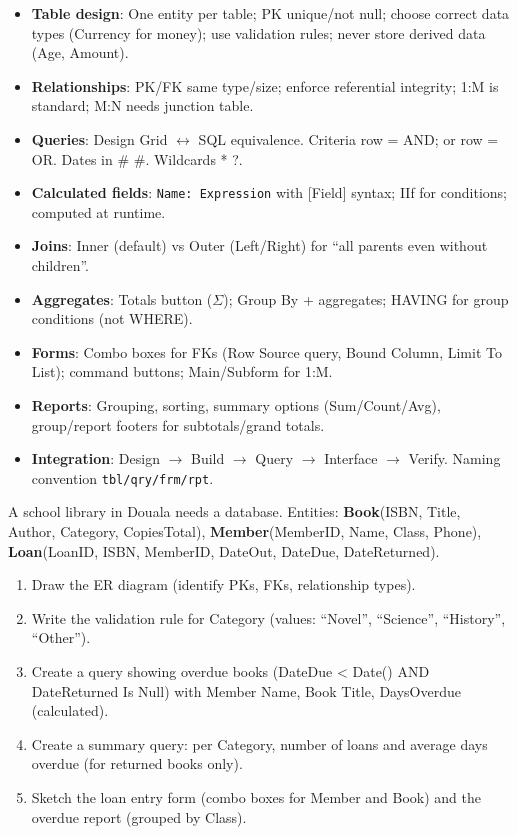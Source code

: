 \documentclass[11pt]{article}
\begin{document}
\begin{aretenir}
\begin{itemize}
\item \textbf{Table design}: One entity per table; PK unique/not null; choose correct data types (Currency for money); use validation rules; never store derived data (Age, Amount).
\item \textbf{Relationships}: PK/FK same type/size; enforce referential integrity; 1:M is standard; M:N needs junction table.
\item \textbf{Queries}: Design Grid $\leftrightarrow$ SQL equivalence. Criteria row = AND; or row = OR. Dates in \# \#. Wildcards * ?.
\item \textbf{Calculated fields}: \texttt{Name: Expression} with [Field] syntax; IIf for conditions; computed at runtime.
\item \textbf{Joins}: Inner (default) vs Outer (Left/Right) for ``all parents even without children''.
\item \textbf{Aggregates}: Totals button ($\Sigma$); Group By + aggregates; HAVING for group conditions (not WHERE).
\item \textbf{Forms}: Combo boxes for FKs (Row Source query, Bound Column, Limit To List); command buttons; Main/Subform for 1:M.
\item \textbf{Reports}: Grouping, sorting, summary options (Sum/Count/Avg), group/report footers for subtotals/grand totals.
\item \textbf{Integration}: Design $\rightarrow$ Build $\rightarrow$ Query $\rightarrow$ Interface $\rightarrow$ Verify. Naming convention \texttt{tbl/qry/frm/rpt}.
\end{itemize}
\end{aretenir}

\begin{exercice}
A school library in Douala needs a database. Entities: \textbf{Book}(ISBN, Title, Author, Category, CopiesTotal), \textbf{Member}(MemberID, Name, Class, Phone), \textbf{Loan}(LoanID, ISBN, MemberID, DateOut, DateDue, DateReturned).
\begin{enumerate}
\item Draw the ER diagram (identify PKs, FKs, relationship types).
\item Write the validation rule for Category (values: ``Novel'', ``Science'', ``History'', ``Other'').
\item Create a query showing overdue books (DateDue < Date() AND DateReturned Is Null) with Member Name, Book Title, DaysOverdue (calculated).
\item Create a summary query: per Category, number of loans and average days overdue (for returned books only).
\item Sketch the loan entry form (combo boxes for Member and Book) and the overdue report (grouped by Class).
\end{enumerate}
\end{exercice}
\end{document}
